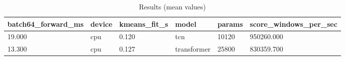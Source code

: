 \begin{table}[h]
\centering
\caption{Results (mean values)}
\label{tab:res}
\begin{tabular}{llllll}
\toprule
batch64\_forward\_ms & device & kmeans\_fit\_s & model & params & score\_windows\_per\_sec \\
\midrule
19.000 & cpu & 0.120 & tcn & 10120 & 950260.000 \\
13.300 & cpu & 0.127 & transformer & 25800 & 830359.700 \\
\bottomrule
\end{tabular}
\end{table}

